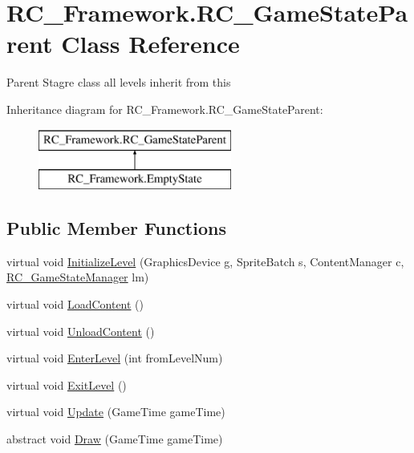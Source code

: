 \hypertarget{class_r_c___framework_1_1_r_c___game_state_parent}{}\section{R\+C\+\_\+\+Framework.\+R\+C\+\_\+\+Game\+State\+Parent Class Reference}
\label{class_r_c___framework_1_1_r_c___game_state_parent}


Parent Stagre class all levels inherit from this  


Inheritance diagram for R\+C\+\_\+\+Framework.\+R\+C\+\_\+\+Game\+State\+Parent\+:\begin{figure}[H]
\begin{center}
\leavevmode
\includegraphics[height=2.000000cm]{class_r_c___framework_1_1_r_c___game_state_parent}
\end{center}
\end{figure}
\subsection*{Public Member Functions}
\begin{DoxyCompactItemize}
\item 
virtual void \mbox{\hyperlink{class_r_c___framework_1_1_r_c___game_state_parent_a3fd47a4805f19683bc68eb3e20f36086}{Initialize\+Level}} (Graphics\+Device g, Sprite\+Batch s, Content\+Manager c, \mbox{\hyperlink{class_r_c___framework_1_1_r_c___game_state_manager}{R\+C\+\_\+\+Game\+State\+Manager}} lm)
\item 
virtual void \mbox{\hyperlink{class_r_c___framework_1_1_r_c___game_state_parent_a6c87e9eecbd5ac046fd1987ea09da716}{Load\+Content}} ()
\item 
virtual void \mbox{\hyperlink{class_r_c___framework_1_1_r_c___game_state_parent_a7752d80f5d187c87f85ec6a2c38b2dc1}{Unload\+Content}} ()
\item 
virtual void \mbox{\hyperlink{class_r_c___framework_1_1_r_c___game_state_parent_a99f481185124bd50d92a032416e96d7a}{Enter\+Level}} (int from\+Level\+Num)
\item 
virtual void \mbox{\hyperlink{class_r_c___framework_1_1_r_c___game_state_parent_a1501d4293365e35c42a659a7d7477fc7}{Exit\+Level}} ()
\item 
virtual void \mbox{\hyperlink{class_r_c___framework_1_1_r_c___game_state_parent_af276a58dd0a0581095a2776801942860}{Update}} (Game\+Time game\+Time)
\item 
abstract void \mbox{\hyperlink{class_r_c___framework_1_1_r_c___game_state_parent_adec421bc58a381ab34ffa74b495fa3c9}{Draw}} (Game\+Time game\+Time)
\end{DoxyCompactItemize}
